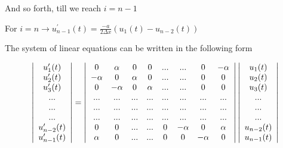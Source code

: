 And so forth, till we reach $i=n-1$

For $i=n\longrightarrow u_{n-1}^{\prime}(t)=\frac{-a}{2\Delta x}(u_{1}(t)-u_{n-2}(t))$ 
\vspace{2mm}

The system of linear equations can be written in the following form

\[
\left| 
\begin{array}{c}
u_{1}^{\prime}(t) \\
u_{2}^{\prime}(t) \\
u_{3}^{\prime}(t) \\
...\\
...\\
...\\
u_{n-2}^{\prime}(t) \\
u_{n-1}^{\prime}(t) \\
\end{array} 
\right|
=
\left| 
\begin{array}{ccc ccccc}
0       & \alpha  & 0      & 0      & ... & ... & 0 & -\alpha \\
-\alpha & 0       & \alpha & 0      & ... & ... & 0 & 0 \\
0       & -\alpha & 0      & \alpha & ... & ... & 0 & 0\\
... & ... & ... & ... & ... & ... & ... & ...\\
... & ... & ... & ... & ... & ... & ... & ...\\
... & ... & ... & ... & ... & ... & ... & ...\\
0 & 0 & ... & ... & 0 & -\alpha & 0       & \alpha\\
\alpha & 0 & ... & ... & 0 & 0       & -\alpha & 0\\
\end{array} 
\right|
\left| 
\begin{array}{c}
u_{1}(t) \\
u_{2}(t) \\
u_{3}(t) \\
...\\
...\\
...\\
u_{n-2}(t) \\
u_{n-1}(t) \\
\end{array} 
\right|
\] 

